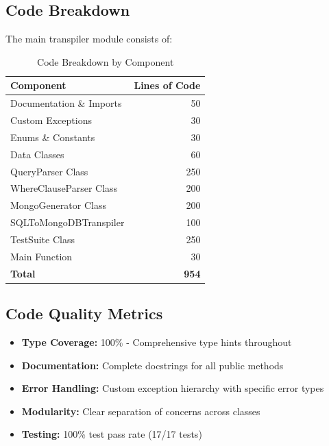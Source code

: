 \documentclass[12pt,a4paper]{article}
\begin{document}
\subsection{Code Breakdown}

The main transpiler module consists of:

\begin{table}[H]
    \centering
    \begin{tabular}{|l|r|}
        \hline
        \textbf{Component} & \textbf{Lines of Code} \\
        \hline
        Documentation \& Imports & 50 \\
        Custom Exceptions & 30 \\
        Enums \& Constants & 30 \\
        Data Classes & 60 \\
        QueryParser Class & 250 \\
        WhereClauseParser Class & 200 \\
        MongoGenerator Class & 200 \\
        SQLToMongoDBTranspiler & 100 \\
        TestSuite Class & 250 \\
        Main Function & 30 \\
        \hline
        \textbf{Total} & \textbf{954} \\
        \hline
    \end{tabular}
    \caption{Code Breakdown by Component}
    \label{tab:code-breakdown}
\end{table}

\subsection{Code Quality Metrics}

\begin{itemize}
    \item \textbf{Type Coverage:} 100\% - Comprehensive type hints throughout
    \item \textbf{Documentation:} Complete docstrings for all public methods
    \item \textbf{Error Handling:} Custom exception hierarchy with specific error types
    \item \textbf{Modularity:} Clear separation of concerns across classes
    \item \textbf{Testing:} 100\% test pass rate (17/17 tests)
\end{itemize}
\end{document}
